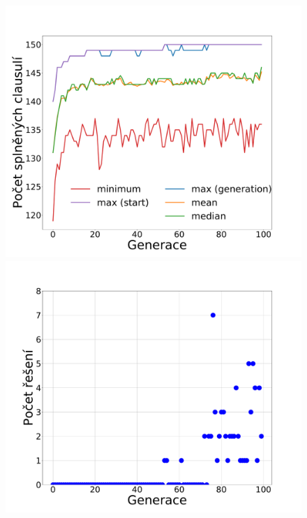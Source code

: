 \documentclass[11pt]{article}
\begin{document}
\begin{figure}
	\centering
    \begin{minipage}[c]{0.32\textwidth}
        \centering\includegraphics[width=\textwidth]{img/1c.pdf} 
    \end{minipage}
    \begin{minipage}[c]{0.32\textwidth}
        \centering \includegraphics[width=\textwidth]{img/1s.pdf} 
    \end{minipage}
    \begin{minipage}[c]{0.32\textwidth}

\end{minipage}
\end{figure}
\end{document}
